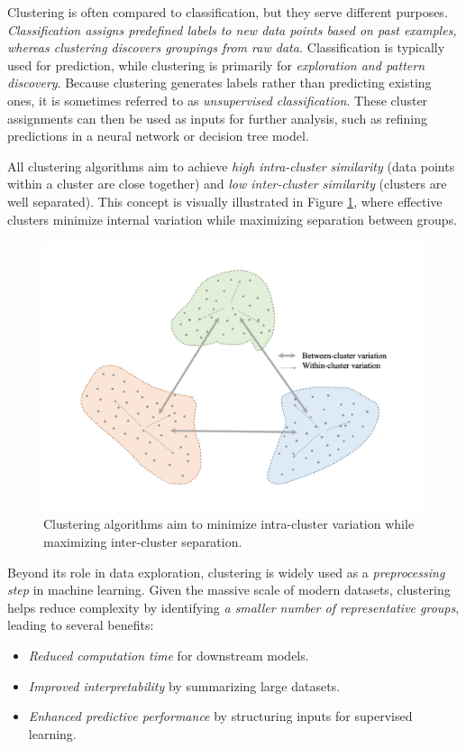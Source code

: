 \documentclass[
]{book}
\providecommand{\tightlist}{%
  \setlength{\itemsep}{0pt}\setlength{\parskip}{0pt}}
\theoremstyle{definition}
\theoremstyle{definition}
\theoremstyle{definition}
\theoremstyle{definition}
\theoremstyle{remark}
\begin{document}
Clustering is often compared to classification, but they serve different purposes. \emph{Classification assigns predefined labels to new data points based on past examples, whereas clustering discovers groupings from raw data.} Classification is typically used for prediction, while clustering is primarily for \emph{exploration and pattern discovery}. Because clustering generates labels rather than predicting existing ones, it is sometimes referred to as \emph{unsupervised classification}. These cluster assignments can then be used as inputs for further analysis, such as refining predictions in a neural network or decision tree model.

All clustering algorithms aim to achieve \emph{high intra-cluster similarity} (data points within a cluster are close together) and \emph{low inter-cluster similarity} (clusters are well separated). This concept is visually illustrated in Figure \ref{fig:cluster-1}, where effective clusters minimize internal variation while maximizing separation between groups.

\begin{figure}

{\centering \includegraphics[width=0.75\linewidth]{images/cluster_1} 

}

\caption{Clustering algorithms aim to minimize intra-cluster variation while maximizing inter-cluster separation.}\label{fig:cluster-1}
\end{figure}

Beyond its role in data exploration, clustering is widely used as a \emph{preprocessing step} in machine learning. Given the massive scale of modern datasets, clustering helps reduce complexity by identifying \emph{a smaller number of representative groups}, leading to several benefits:

\begin{itemize}
\tightlist
\item
  \emph{Reduced computation time} for downstream models.\\
\item
  \emph{Improved interpretability} by summarizing large datasets.\\
\item
  \emph{Enhanced predictive performance} by structuring inputs for supervised learning.
\end{itemize}
\end{document}

